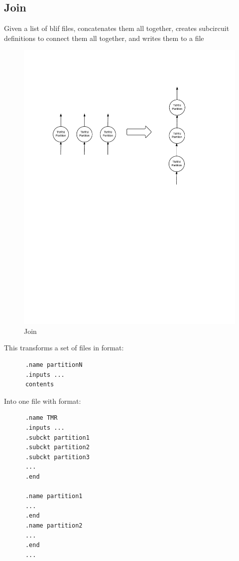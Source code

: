 \documentclass[12pt,final,oneside]{dwThesis} %
\begin{document}
   \subsection{Join}\label{algJoin}
   Given a list of blif files, concatenates them all together, creates
   subcircuit definitions to connect them all together, and writes them to a file
   \begin{figure}
      \begin{center}
         \includegraphics[width=\linewidth]{images/Join.pdf}
         \caption{Join}
         \label{imJoin}
      \end{center}
   \end{figure}

   This transforms a set of files in format:
   \begin{lstlisting}
      .name partitionN
      .inputs ...
      contents
   \end{lstlisting}
   Into one file with format:
   \begin{lstlisting}
      .name TMR
      .inputs ...
      .subckt partition1
      .subckt partition2
      .subckt partition3
      ...
      .end

      .name partition1
      ...
      .end
      .name partition2
      ...
      .end
      ...
   \end{lstlisting}
   \newpage
\end{document}
